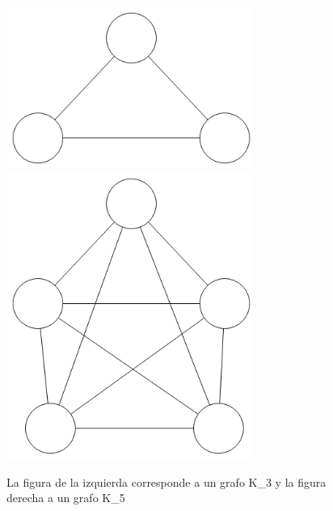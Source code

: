 \begin{figure}[H]
\includegraphics[width=80mm]{K3.png}
\includegraphics[width=80mm]{K5.png}
\caption{La figura de la izquierda corresponde a un grafo K_3 y la figura derecha a un grafo K_5}
\label{overflow}
\end{figure}